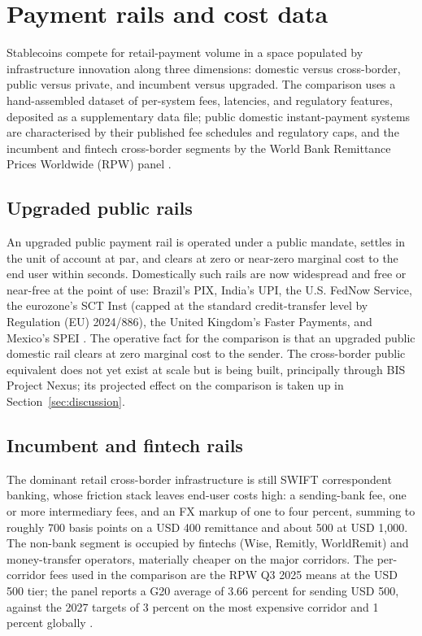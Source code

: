 \section{Payment rails and cost data}\label{sec:landscape}

Stablecoins compete for retail-payment volume in a space populated by infrastructure innovation along three dimensions: domestic versus cross-border, public versus private, and incumbent versus upgraded. The comparison uses a hand-assembled dataset of per-system fees, latencies, and regulatory features, deposited as a supplementary data file; public domestic instant-payment systems are characterised by their published fee schedules and regulatory caps, and the incumbent and fintech cross-border segments by the World Bank Remittance Prices Worldwide (RPW) panel \citep{rpw_q3_2025,beck_martinez_peria_2011}.

\subsection{Upgraded public rails}\label{sub:upgraded_public}

An upgraded public payment rail is operated under a public mandate, settles in the unit of account at par, and clears at zero or near-zero marginal cost to the end user within seconds. Domestically such rails are now widespread and free or near-free at the point of use: Brazil's PIX, India's UPI, the U.S. FedNow Service, the eurozone's SCT Inst (capped at the standard credit-transfer level by Regulation (EU) 2024/886), the United Kingdom's Faster Payments, and Mexico's SPEI \citep{frost_etal_2024_fast_payments,duarte_etal_2022_pix}. The operative fact for the comparison is that an upgraded public domestic rail clears at zero marginal cost to the sender. The cross-border public equivalent does not yet exist at scale but is being built, principally through BIS Project Nexus; its projected effect on the comparison is taken up in Section~\ref{sec:discussion}.

\subsection{Incumbent and fintech rails}\label{sub:incumbent_cross_border}

The dominant retail cross-border infrastructure is still SWIFT correspondent banking, whose friction stack \citep{cpmi_2018_cross_border_retail} leaves end-user costs high: a sending-bank fee, one or more intermediary fees, and an FX markup of one to four percent, summing to roughly 700 basis points on a USD 400 remittance and about 500 at USD 1{,}000. The non-bank segment is occupied by fintechs (Wise, Remitly, WorldRemit) and money-transfer operators, materially cheaper on the major corridors. The per-corridor fees used in the comparison are the RPW Q3 2025 means at the USD 500 tier; the panel reports a G20 average of 3.66 percent for sending USD 500, against the 2027 targets of 3 percent on the most expensive corridor and 1 percent globally \citep{rpw_q3_2025}.

